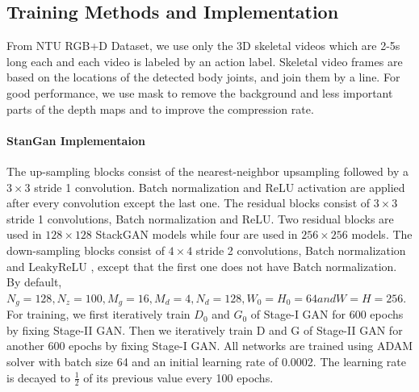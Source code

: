 \documentclass{article}
\begin{document}
\subsection{Training Methods and Implementation}
From NTU RGB+D Dataset, we use only the 3D skeletal videos which are 2-5s long each and each video is labeled by an action label. Skeletal video frames are based on the locations of the detected body joints, and join them by a line. For good performance, we use mask to remove the background and less important parts of the depth maps and to improve the compression rate.

\paragraph{StanGan Implementaion}
The up-sampling blocks consist of the nearest-neighbor upsampling followed by a $3 \times 3$ stride 1 convolution. Batch normalization \cite{batchNorm2014} and ReLU activation are applied after every convolution except the last one. The residual blocks consist of $3 \times 3$ stride 1 convolutions, Batch normalization and ReLU. Two residual blocks are used in $128 \times 128$ StackGAN models while four are used in $256 \times 256$ models. The down-sampling blocks consist of $4 \times 4$ stride 2 convolutions, Batch normalization and LeakyReLU \cite{rectifier2013, rectifierConv2015}, except that the first one does not have Batch normalization.
\\
By default, $N_g = 128, N_z = 100, M_g = 16, M_d = 4, N_d = 128, W_0 = H_0 = 64 and W = H = 256$. For training, we first iteratively train $D_0$ and $G_0$ of Stage-I GAN for 600 epochs by fixing Stage-II GAN. Then we iteratively train D and G of Stage-II GAN for another 600 epochs by fixing Stage-I GAN. All networks are trained using ADAM solver with batch size 64 and an initial learning rate of 0.0002. The learning rate is decayed to $\frac{1}{2}$ of its previous value every 100 epochs.
\end{document}
